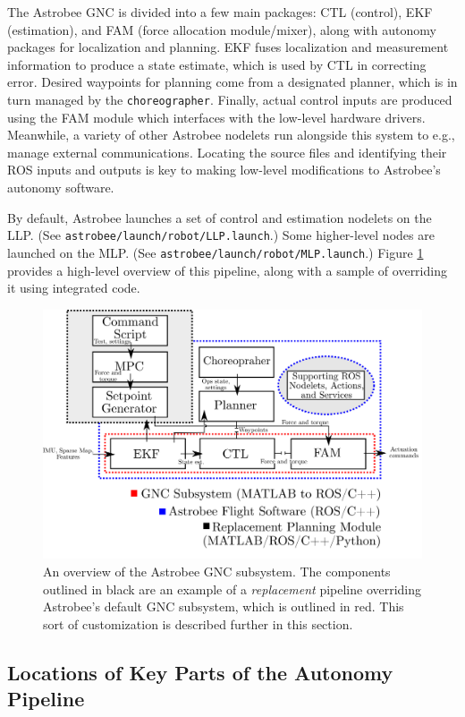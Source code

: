\documentclass{article}
\begin{document}
The Astrobee GNC is divided into a few main packages: CTL (control), EKF (estimation), and FAM (force allocation module/mixer), along with autonomy packages for localization and planning. EKF fuses localization and measurement information to produce a state estimate, which is used by CTL in correcting error. Desired waypoints for planning come from a designated planner, which is in turn managed by the \texttt{choreographer}. Finally, actual control inputs are produced using the FAM module which interfaces with the low-level hardware drivers. Meanwhile, a variety of other Astrobee nodelets run alongside this system to e.g., manage external communications. Locating the source files and identifying their ROS inputs and outputs is key to making low-level modifications to Astrobee's autonomy software. 

By default, Astrobee launches a set of control and estimation nodelets on the LLP. (See \texttt{astrobee/launch/robot/LLP.launch}.) Some higher-level nodes are launched on the MLP. (See \texttt{astrobee/launch/robot/MLP.launch}.) Figure \ref{fig:gnc} provides a high-level overview of this pipeline, along with a sample of overriding it using integrated code. 

\begin{figure}[h!]
	\centering
	\includegraphics[width=1.0\textwidth]{img/Astrobee_GNC.png}
	\caption{An overview of the Astrobee GNC subsystem. The components outlined in black are an example of a \textit{replacement} pipeline overriding Astrobee's default GNC subsystem, which is outlined in red. This sort of customization is described further in this section.}
	\label{fig:gnc}
\end{figure}

\subsection{Locations of Key Parts of the Autonomy Pipeline}
\end{document}
